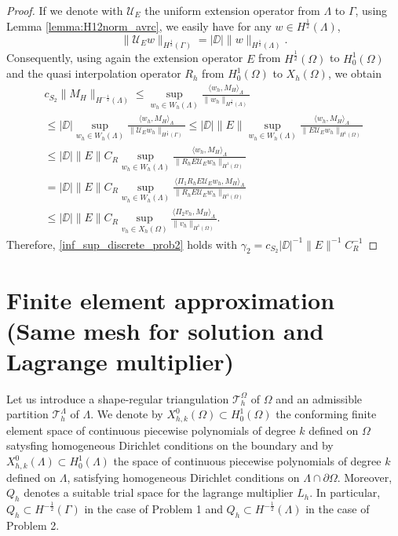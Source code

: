 \begin{proof}
If we denote with $\mathcal{U}_E$ the uniform extension operator from $\Lambda$ to $\Gamma$, using Lemma \ref{lemma:H12norm_avrc}, we easily have for any $w \in H^{\frac 12}(\Lambda)$,
\begin{equation*}
\|\mathcal{U}_E w\|_{H^{\frac 12}(\Gamma)}=|\DD| \|w\|_{H^{\frac 12}(\Lambda)}.
\end{equation*}
Consequently, using again the extension operator $E$ from $H^{\frac 12}(\Omega)$ to $H^1_0(\Omega)$ and the quasi interpolation operator $R_h$ from $H^1_0(\Omega)$ to $X_h(\Omega)$, we obtain
\begin{multline}
c_{S_2} \|M_H\|_{H^{-\frac 12}(\Lambda)} \leq 
\sup_{w_h \in W_h(\Lambda)} \frac{ \langle w_h, M_H \rangle_{\Lambda} } {\|w_h\|_{H^{\frac 12}(\Lambda)}} 
\\
\leq |\DD| \sup_{w_h \in W_h(\Lambda)} \frac{ \langle w_h, M_H \rangle _{\Lambda}} {\|\mathcal{U}_E w_h\|_{H^{\frac 12}(\Gamma)}} 
\leq |\DD| \|E\| \sup_{w_h \in W_h(\Lambda)} \frac{ \langle w_h, M_H \rangle _{\Lambda} } {\|E \mathcal{U}_E w_h\|_{H^1(\Omega)}} 
\\
\leq |\DD|\|E\| C_R \sup_{w_h \in W_h(\Lambda)} \frac{ \langle w_h, M_H \rangle _{\Lambda} } {\|R_h E \mathcal{U}_E w_h\|_{H^1(\Omega)}}
\\ 
=  |\DD| \|E\| C_R \sup_{w_h \in W_h(\Lambda)} \frac{ \langle \Pi _1  R_h E \mathcal{U}_E w_h, M_H \rangle _{\Lambda}} {\|R_h E \mathcal{U}_E w_h\|_{H^1(\Omega)}}
\\
\leq |\DD| \|E\| C_R \sup_{v_h \in X_h(\Omega)} \frac{ \langle \Pi _2  v_h, M_H \rangle _{\Lambda}} {\|v_h\|_{H^1(\Omega)}}. 
\end{multline}
Therefore, \eqref{inf_sup_discrete_prob2} holds with $\gamma_2=  c_{S_2} |\DD|^{-1} \|E\|^{-1} C_R^{-1}$
\end{proof}

\section{Finite element approximation (Same mesh for solution and Lagrange multiplier)}
Let us introduce a shape-regular triangulation $\mathcal{T}^{\Omega}_h$ of $\Omega$ and an admissible partition $\mathcal{T}^{\Lambda}_{h}$ of $\Lambda$. We denote by $X_{h,k}^0(\Omega)\subset H^1_0(\Omega)$ the conforming finite element space of continuous piecewise polynomials of degree $k$ defined on $\Omega$ satysfing homogeneous Dirichlet conditions on the boundary and by $X_{h,k}^0(\Lambda)\subset H^1_0(\Lambda)$ the space of continuous piecewise polynomials of degree $k$ defined on $\Lambda$, satisfying homogeneous Dirichlet conditions on $\Lambda \cap \partial \Omega$. Moreover, $Q_{h}$ denotes a suitable trial space for the lagrange multiplier $L_h$. In particular, $Q_h \subset H^{-\frac12}(\Gamma )$ in the case of Problem 1 and $Q_h \subset H^{-\frac12}(\Lambda)$ in the case of Problem 2.
 
